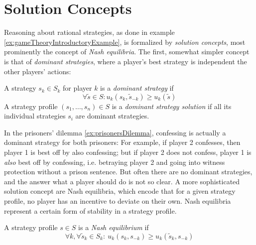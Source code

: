 \documentclass[a4paper]{scrreprt}
\begin{document}
    \section{Solution Concepts}
    Reasoning about rational strategies, as done in example \ref{ex:gameTheoryIntroductoryExample}, is formalized by \emph{solution concepts}, most prominently the concept of \emph{Nash equilibria}. The first, somewhat simpler concept is that of \emph{dominant strategies}, where a player's best strategy is independent the other players' actions:
    
    \begin{defn}
        A strategy $s_k \in S_k$ for player $k$ is a \emph{dominant strategy} if 
        \[ \forall \tilde{s} \in S: u_k(s_k, \tilde{s}_{-k}) \geq u_k(\tilde{s}) \]
        A strategy profile $(s_1, \dots, s_n) \in S$ is a \emph{dominant strategy solution} if all its individual strategies $s_i$ are dominant strategies.
    \end{defn}
    
    In the prisoners' dilemma \ref{ex:prisonersDilemma}, confessing is actually a dominant strategy for both prisoners:
    For example, if player 2 confesses, then player 1 is best off by also confessing; but if player 2 does not confess, player 1 is \emph{also} best off by confessing, i.e. betraying player 2 and going into witness protection without a prison sentence.
    But often there are no dominant strategies, and the answer what a player should do is not so clear.
    A more sophisticated solution concept are Nash equilibria, which encode that for a given strategy profile, no player has an incentive to deviate on their own. Nash equilibria represent a certain form of stability in a strategy profile.
    
    \begin{defn}
        A strategy profile $s \in S$ is a \emph{Nash equilibrium} if
        \[
            \forall k, \forall \tilde{s}_k \in S_k:~ u_k(s_k, s_{-k}) \geq u_k(\tilde{s}_k, s_{-k})
        \]
        \label{def:nashEquilibriumRealValued}
    \end{defn}
    
\end{document}
